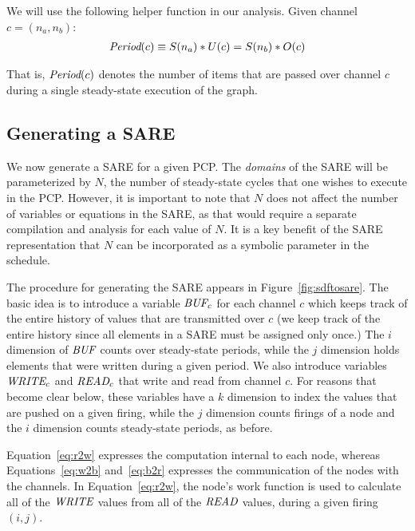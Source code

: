 We will use the following helper function in our analysis.  Given
channel $c = (n_a, n_b)$:
\begin{align*}
\mbox{\it Period}(c) \equiv S(n_a) * U(c) = S(n_b) * O(c)
\end{align*}

That is, $\mbox{\it Period}(c)$ denotes the number of items that are passed
over channel $c$ during a single steady-state execution of the graph.

\subsection{Generating a SARE}

We now generate a SARE for a given PCP.  The {\it domains} of the SARE
will be parameterized by $N$, the number of steady-state cycles that
one wishes to execute in the PCP.  However, it is important to note
that $N$ does not affect the number of variables or equations in the
SARE, as that would require a separate compilation and analysis for
each value of $N$.  It is a key benefit of the SARE representation
that $N$ can be incorporated as a symbolic parameter in the schedule.



The procedure for generating the SARE appears in
Figure~\ref{fig:sdftosare}.  The basic idea is to introduce a variable
$\mbox{\it BUF}_c$ for each channel $c$ which keeps track of the entire history
of values that are transmitted over $c$ (we keep track of the entire
history since all elements in a SARE must be assigned only once.)  The
$i$ dimension of $\mbox{\it BUF}$ counts over steady-state periods, while the $j$
dimension holds elements that were written during a given period.  We
also introduce variables $\mbox{\it WRITE}_c$ and $\mbox{\it READ}_c$ that write and read
from channel $c$.  For reasons that become clear below, these
variables have a $k$ dimension to index the values that are pushed on
a given firing, while the $j$ dimension counts firings of a node and
the $i$ dimension counts steady-state periods, as before.

Equation~\ref{eq:r2w} expresses the computation internal to each node,
whereas Equations~\ref{eq:w2b} and~\ref{eq:b2r} expresses the
communication of the nodes with the channels.  In
Equation~\ref{eq:r2w}, the node's work function is used to calculate
all of the $\mbox{\it WRITE}$ values from all of the $\mbox{\it READ}$ values,
during a given firing $(i,j)$. 

